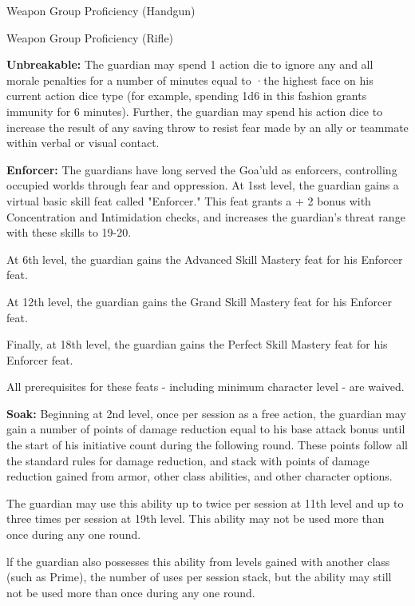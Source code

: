 Weapon Group Proficiency (Handgun)

Weapon Group Proficiency (Rifle)

\textbf{Unbreakable:} The guardian may spend 1 action die to ignore any and all morale penalties for a number of minutes equal to ·the highest face on his current action dice type (for example, spending 1d6 in this fashion grants immunity for 6 minutes).
Further, the guardian may spend his action dice to increase the result of any saving throw to resist fear made by an ally or teammate within verbal or visual contact.

\vspace*{5pt}

\textbf{Enforcer:} The guardians have long served the Goa'uld as enforcers, controlling occupied worlds through fear and oppression. At 1sst level, the guardian gains a virtual basic skill feat called "Enforcer." This feat grants a + 2 bonus with Concentration and Intimidation checks, and increases the guardian's threat range with these skills to 19-20.

At 6th level, the guardian gains the Advanced Skill Mastery feat for his Enforcer feat.

At 12th level, the guardian gains the Grand Skill Mastery feat for his Enforcer feat.

Finally, at 18th level, the guardian gains the Perfect Skill Mastery feat for his Enforcer feat.

All prerequisites for these feats - including minimum character level - are waived.

\textbf{Soak:} Beginning at 2nd level, once per session as a free action, the guardian may gain a number of points of damage reduction equal to his base attack bonus until the start of his initiative count during the following round. These points follow all the standard rules for damage reduction, and stack with points of damage reduction gained from armor, other class abilities, and other character options.

The guardian may use this ability up to twice per session at 11th level and up to three times per session at 19th level. This ability may not be used more than once during any one round.

lf the guardian also possesses this ability from levels gained with another class (such as Prime), the number of uses per session stack, but the ability may still not be used more than once during any one round.

